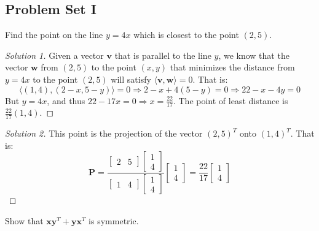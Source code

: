 \documentclass[crop=false,class=book,oneside]{standalone}
\begin{document}
        \subsection{Problem Set I}
        \begin{problem}
        Find the point on the line $y=4x$ which is closest to the point $(2,5)$.
        \end{problem}
        \begin{proof}[Solution 1]
        Given a vector $\mathbf{v}$ that is parallel to the line $y$, we know that the vector $\mathbf{w}$ from $(2,5)$ to the point $(x,y)$ that minimizes the distance from $y=4x$ to the point $(2,5)$ will satisfy $\langle \mathbf{v}, \mathbf{w}\rangle = 0$. That is:
        \begin{equation*}
            \big\langle (1,4), (2-x,5-y)\big\rangle = 0\Rightarrow 2-x+4(5-y) = 0 \Rightarrow 22 - x - 4 y = 0    
        \end{equation*}
        But $y = 4x$, and thus $22-17x = 0 \Rightarrow x= \frac{22}{17}$. The point of least distance is $\frac{22}{17}(1,4)$.
        \end{proof}
        \begin{proof}[Solution 2]
        This point is the projection of the vector $(2,5)^T$ onto $(1,4)^T$. That is:
        \begin{equation*}
            \mathbf{P} = \frac{\begin{bmatrix}2 & 5 \end{bmatrix} \begin{bmatrix} 1 \\ 4 \end{bmatrix}}{\begin{bmatrix} 1 & 4 \end{bmatrix} \begin{bmatrix} 1 \\ 4 \end{bmatrix}} \begin{bmatrix} 1 \\ 4 \end{bmatrix} = \frac{22}{17} \begin{bmatrix} 1 \\ 4\end{bmatrix}
        \end{equation*}
        \end{proof}
        \begin{problem}
        Show that $\mathbf{x}\mathbf{y}^T + \mathbf{y}\mathbf{x}^T$ is symmetric.
        \end{problem}
\end{document}
